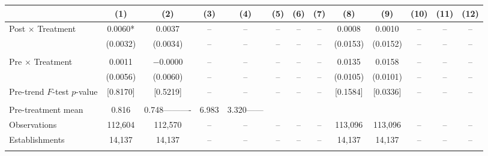 \documentclass[12pt,letterpaper]{article}
\begin{document}
\begin{table}[]
\begin{threeparttable}
\begin{tabular}{lcccccccccccc}
 & (1) & (2) & (3) & (4) & (5) & (6) & (7) & (8) & (9) & (10) & (11) & (12) \\
\midrule
Post $\times$ Treatment & 0.0060* & 0.0037 & -- & -- & -- & -- & -- & 0.0008 & 0.0010 & -- & -- & -- \\
  & (0.0032) & (0.0034) & -- & -- & -- & -- & -- & (0.0153) & (0.0152) & -- & -- & -- \\
  &  &  &  &  &  &  &  &  &  &  &  & \\
Pre $\times$ Treatment & 0.0011 & $-$0.0000 & -- & -- & -- & -- & -- & 0.0135 & 0.0158 & -- & -- & -- \\
  & (0.0056) & (0.0060) & -- & -- & -- & -- & -- & (0.0105) & (0.0101) & -- & -- & -- \\
Pre-trend $F$-test $p$-value & [0.8170] & [0.5219] & -- & -- & -- & -- & -- & [0.1584] & [0.0336] & -- & -- & -- \\
  &  &  &  &  &  &  &  &  &  &  &  & \\
Pre-treatment mean & 0.816 & 0.748---------- & 6.983 & 3.320------ \\
Observations & 112{,}604 & 112{,}570 & -- & -- & -- & -- & -- & 113{,}096 & 113{,}096 & -- & -- & -- \\
Establishments & 14{,}137 & 14{,}137 & -- & -- & -- & -- & -- & 14{,}137 & 14{,}137 & -- & -- & -- \\
  &  &  &  &  &  &  &  &  &  &  &  & \\
\midrule

\end{tabular}
\end{threeparttable}
\end{table}
\end{document}

